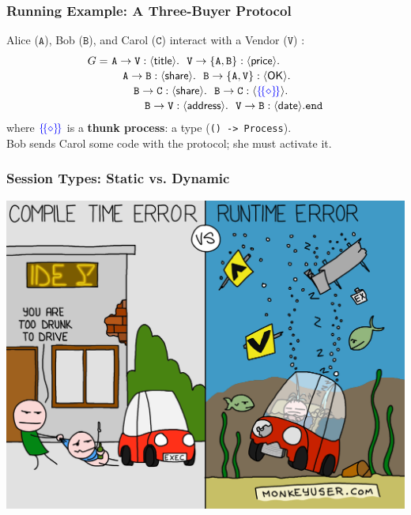 \documentclass[12pt]{beamer}
\begin{document}
\begin{frame}[fragile]
\frametitle{Running Example: A Three-Buyer Protocol}

Alice ($\mathtt{A}$), Bob ($\mathtt{B}$), and Carol ($\mathtt{C}$) interact with a Vendor ($\mathtt{V}$) :
\begin{align*}
G = ~&  \mathtt{A}\to\mathtt{\texttt{V}}:\langle \mathsf{title}\rangle.~~\mathtt{\mathtt{V}}\to\mathtt{\{A,B\}}:\langle \mathsf{price}\rangle.\\[-0.5mm] 
 & \quad\mathtt{A}\to\mathtt{B}:\langle \mathsf{share}\rangle.~~\mathtt{B}\to\mathtt{\{A,\mathtt{V}\}}:\langle \mathsf{OK}\rangle.
 \\[-0.5mm]
 & \quad\quad \mathtt{B}\to\mathtt{C}:\langle \mathsf{share}\rangle.~~\mathtt{B}\to\mathtt{C}:\langle \textcolor{blue}{\{\!\{\diamond\}\!\}}\rangle.
 \\[-0.5mm]
 & \quad\qquad \mathtt{B}\to\mathtt{\mathtt{V}}:\langle \mathsf{address}\rangle.~~\mathtt{\mathtt{V}}\to\mathtt{B}:\langle \mathsf{date}\rangle.\mathtt{end}
\end{align*}
where $\textcolor{blue}{\{\!\{\diamond\}\!\}}$ is a \textbf{thunk process}: a type (\texttt{() -> Process}).  \\
Bob sends Carol some code with the protocol; she must activate it.

\end{frame}

\begin{frame}
\frametitle{Session Types: Static vs. Dynamic}

\begin{center}
\includegraphics[scale=0.120]{img/runtime-vs-compile-time-errors.png}
\end{center}
\end{frame}
\end{document}
